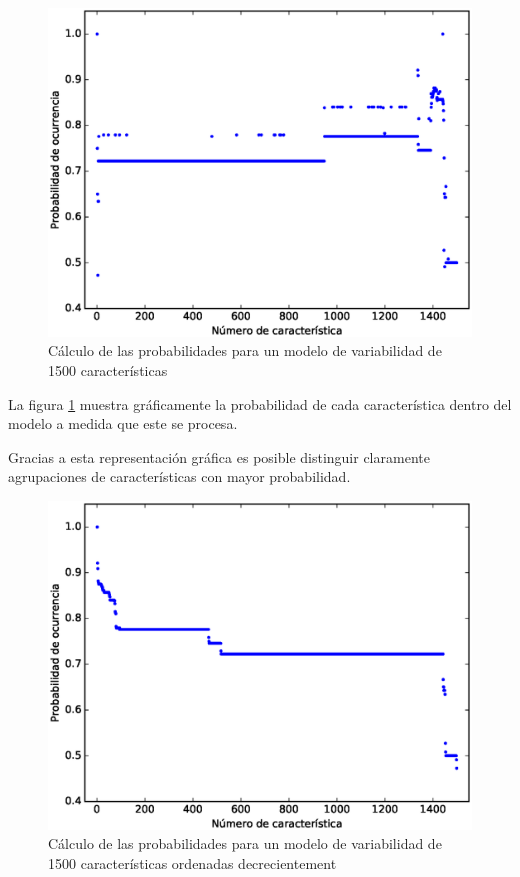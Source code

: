 \begin{figure}[h]
	\centering
	\linefigure
	\includegraphics[width=0.8\hsize,angle=0]{plot_probs_probs.eps}
	\linefigure
	\caption{Cálculo de las probabilidades para un modelo de variabilidad de 1500 características}\label{fig:plot:probs:probs}
\end{figure}

La figura \ref{fig:plot:probs:probs} muestra gráficamente
la probabilidad de cada característica dentro del modelo
a medida que este se procesa.

Gracias a esta representación gráfica es posible distinguir
claramente agrupaciones de características con mayor probabilidad.


\begin{figure}[h]
	\centering
	\linefigure
	\includegraphics[width=0.8\hsize,angle=0]{plot_probs_probs_sorted.eps}
	\linefigure
	\caption{Cálculo de las probabilidades para un modelo de variabilidad de 1500 características ordenadas decrecientement}\label{fig:plot:probs:probs:sorted}
\end{figure}

